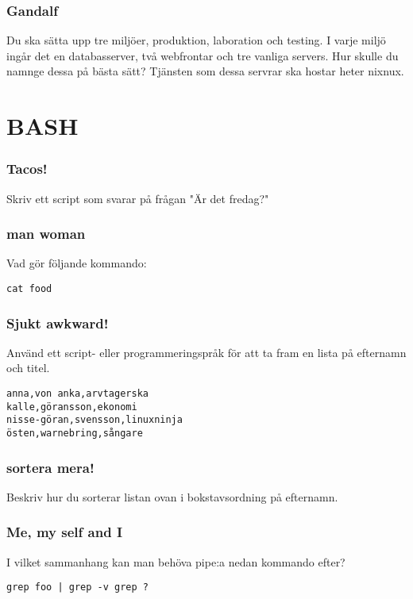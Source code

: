 \documentclass[a4paper]{report}
\begin{document}
\subsubsection{Gandalf}
Du ska sätta upp tre miljöer, produktion, laboration och testing. I varje miljö ingår det en databasserver, två webfrontar och tre vanliga servers. 
Hur skulle du namnge dessa på bästa sätt?
Tjänsten som dessa servrar ska hostar heter nixnux.

\section{BASH}

\subsubsection{Tacos!}
Skriv ett script som svarar på frågan "Är det fredag?"

\subsubsection{man woman}
Vad gör följande kommando:
\begin{verbatim}
cat food
\end{verbatim}

\subsubsection{Sjukt awkward!}
Använd ett script- eller programmeringspråk för att ta fram en lista på efternamn och titel.
\begin{verbatim}
anna,von anka,arvtagerska
kalle,göransson,ekonomi
nisse-göran,svensson,linuxninja
östen,warnebring,sångare
\end{verbatim}

\subsubsection{sortera mera!}
Beskriv hur du sorterar listan ovan i bokstavsordning på efternamn.

\subsubsection{Me, my self and I}
I vilket sammanhang kan man behöva pipe:a nedan kommando efter? 
\begin{verbatim}
grep foo | grep -v grep ?
\end{verbatim}
\end{document}

